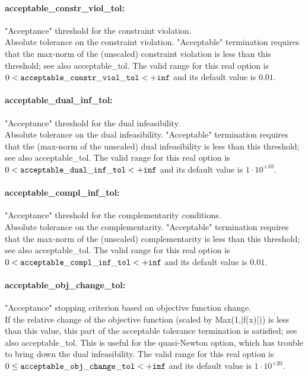 \paragraph{acceptable\_constr\_viol\_tol:}\label{opt:acceptable_constr_viol_tol} "Acceptance" threshold for the constraint violation. \\
 Absolute tolerance on the constraint violation. "Acceptable" termination requires that the max-norm of the (unscaled) constraint violation is less than this threshold; see also acceptable\_tol. The valid range for this real option is 
$0 <  {\tt acceptable\_constr\_viol\_tol } <  {\tt +inf}$
and its default value is $0.01$.


\paragraph{acceptable\_dual\_inf\_tol:}\label{opt:acceptable_dual_inf_tol} "Acceptance" threshold for the dual infeasibility. \\
 Absolute tolerance on the dual infeasibility. "Acceptable" termination requires that the (max-norm of the unscaled) dual infeasibility is less than this threshold; see also acceptable\_tol. The valid range for this real option is 
$0 <  {\tt acceptable\_dual\_inf\_tol } <  {\tt +inf}$
and its default value is $1 \cdot 10^{+10}$.


\paragraph{acceptable\_compl\_inf\_tol:}\label{opt:acceptable_compl_inf_tol} "Acceptance" threshold for the complementarity conditions. \\
 Absolute tolerance on the complementarity. "Acceptable" termination requires that the max-norm of the (unscaled) complementarity is less than this threshold; see also acceptable\_tol. The valid range for this real option is 
$0 <  {\tt acceptable\_compl\_inf\_tol } <  {\tt +inf}$
and its default value is $0.01$.


\paragraph{acceptable\_obj\_change\_tol:}\label{opt:acceptable_obj_change_tol} "Acceptance" stopping criterion based on objective function change. \\
 If the relative change of the objective function (scaled by Max(1,|f(x)|)) is less than this value, this part of the acceptable tolerance termination is satisfied; see also acceptable\_tol.  This is useful for the quasi-Newton option, which has trouble to bring down the dual infeasibility. The valid range for this real option is 
$0 \le {\tt acceptable\_obj\_change\_tol } <  {\tt +inf}$
and its default value is $1 \cdot 10^{+20}$.


